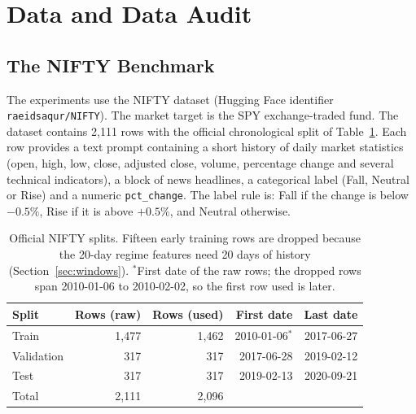 \newpage
\section{Data and Data Audit}\label{ch:data}
\subsection{The NIFTY Benchmark}
The experiments use the NIFTY dataset \cite{saqur2024} (Hugging Face identifier \texttt{raeidsaqur/NIFTY}). The market target is the SPY exchange-traded fund. The dataset contains 2{,}111 rows with the official chronological split of Table~\ref{tab:splits}. Each row provides a text prompt containing a short history of daily market statistics (open, high, low, close, adjusted close, volume, percentage change and several technical indicators), a block of news headlines, a categorical label (Fall, Neutral or Rise) and a numeric \texttt{pct\_change}. The label rule is: Fall if the change is below $-0.5\%$, Rise if it is above $+0.5\%$, and Neutral otherwise.

\begin{table}[H]
\centering
\begin{tabular}{lrrrr}
\toprule
Split & Rows (raw) & Rows (used) & First date & Last date\\
\midrule
Train & 1{,}477 & 1{,}462 & 2010-01-06$^{*}$ & 2017-06-27\\
Validation & 317 & 317 & 2017-06-28 & 2019-02-12\\
Test & 317 & 317 & 2019-02-13 & 2020-09-21\\
\midrule
Total & 2{,}111 & 2{,}096 & & \\
\bottomrule
\end{tabular}
\caption[Official NIFTY splits and rows used]{Official NIFTY splits. Fifteen early training rows are dropped because the 20-day regime features need 20 days of history (Section~\ref{sec:windows}). $^{*}$First date of the raw rows; the dropped rows span 2010-01-06 to 2010-02-02, so the first row used is later.}\label{tab:splits}
\end{table}

